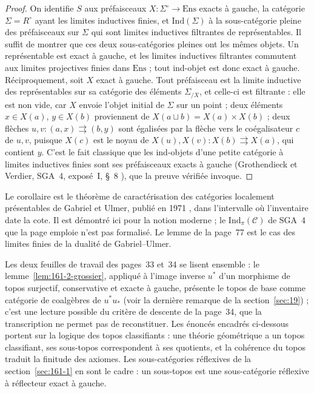 \begin{proof}
On identifie $S$ aux préfaisceaux $X : \Sigma^\circ \to \mathrm{Ens}$ exacts à gauche, la catégorie $\Sigma = R^\circ$ ayant les limites inductives finies, et $\mathrm{Ind}(\Sigma)$ à la sous-catégorie pleine des préfaisceaux sur $\Sigma$ qui sont limites inductives filtrantes de représentables. Il suffit de montrer que ces deux sous-catégories pleines ont les mêmes objets. Un représentable est exact à gauche, et les limites inductives filtrantes commutent aux limites projectives finies dans $\mathrm{Ens}$ ; tout ind-objet est donc exact à gauche. Réciproquement, soit $X$ exact à gauche. Tout préfaisceau est la limite inductive des représentables sur sa catégorie des éléments $\Sigma_{/X}$, et celle-ci est filtrante : elle est non vide, car $X$ envoie l'objet initial de $\Sigma$ sur un point ; deux éléments $x \in X(a)$, $y \in X(b)$ proviennent de $X(a \sqcup b) = X(a) \times X(b)$ ; deux flèches $u, v : (a, x) \rightrightarrows (b, y)$ sont égalisées par la flèche vers le coégalisateur $c$ de $u, v$, puisque $X(c)$ est le noyau de $X(u), X(v) : X(b) \rightrightarrows X(a)$, qui contient $y$. C'est le fait classique que les ind-objets d'une petite catégorie à limites inductives finies sont ses préfaisceaux exacts à gauche (Grothendieck et Verdier, SGA~4, exposé~I, §~8 \cite{sga4-1}), que la preuve vérifiée invoque.
\end{proof}

\begin{remarque}
Le corollaire est le théorème de caractérisation des catégories localement présentables de Gabriel et Ulmer, publié en 1971 \cite{gabrielulmer1971}, dans l'intervalle où l'inventaire date la cote. Il est démontré ici pour la notion moderne ; le $\mathrm{Ind}_\pi(\mathcal C)$ de SGA~4 que la page emploie n'est pas formalisé. Le lemme de la page~77 est le cas des limites finies de la dualité de Gabriel--Ulmer.
\end{remarque}

\begin{remarque}
Les deux feuilles de travail des pages~33 et~34 se lisent ensemble : le lemme~\ref{lem:161-2-grossier}, appliqué à l'image inverse $u^*$ d'un morphisme de topos surjectif, conservative et exacte à gauche, présente le topos de base comme catégorie de coalgèbres de $u^*u_*$ (voir la dernière remarque de la section~\ref{sec:19}) ; c'est une lecture possible du critère de descente de la page~34, que la transcription ne permet pas de reconstituer. Les énoncés encadrés ci-dessous portent sur la logique des topos classifiants : une théorie géométrique a un topos classifiant, ses sous-topos correspondent à ses quotients, et la cohérence du topos traduit la finitude des axiomes. Les sous-catégories réflexives de la section~\ref{sec:161-1} en sont le cadre : un sous-topos est une sous-catégorie réflexive à réflecteur exact à gauche.
\end{remarque}

